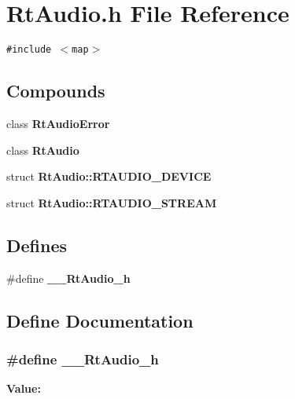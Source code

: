 \section{Rt\-Audio.h File Reference}
\label{RtAudio_8h}
{\tt \#include $<$map$>$}\par
\subsection*{Compounds}
\begin{CompactItemize}
\item 
class {\bf Rt\-Audio\-Error}
\item 
class {\bf Rt\-Audio}
\item 
struct {\bf Rt\-Audio::RTAUDIO\_\-DEVICE}
\item 
struct {\bf Rt\-Audio::RTAUDIO\_\-STREAM}
\end{CompactItemize}
\subsection*{Defines}
\begin{CompactItemize}
\item 
\#define {\bf \_\-\_\-Rt\-Audio\_\-h}
\end{CompactItemize}


\subsection{Define Documentation}
\subsubsection{\setlength{\rightskip}{0pt plus 5cm}\#define \_\-\_\-Rt\-Audio\_\-h}\label{RtAudio_8h_a0}


{\bf Value:}\footnotesize\begin{verbatim}
\end{verbatim}\normalsize 
